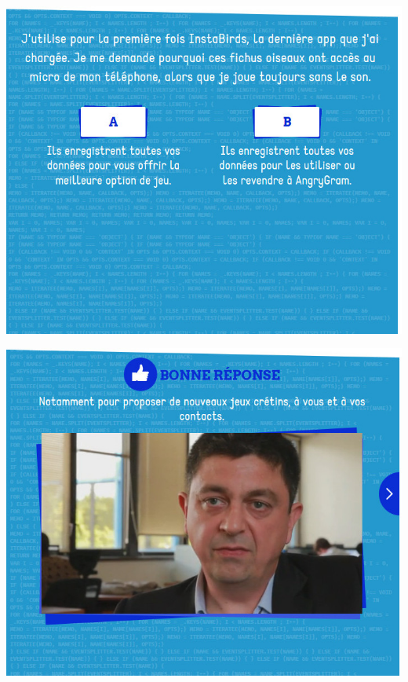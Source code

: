 \documentclass{beamer}
\begin{document}
\begin{frame}\includegraphics[scale=0.6] {./images/Quizz_HygieneNumerique_France4_30.jpg} \end{frame}
\begin{frame}\includegraphics[scale=0.6] {./images/Quizz_HygieneNumerique_France4_31.jpg} \end{frame}
\end{document}
